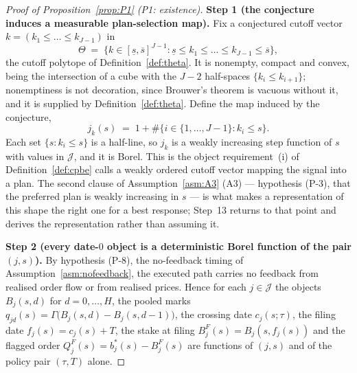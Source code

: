 \begin{proof}[Proof of Proposition~\ref{prop:P1} (P1: existence)]
\smallskip
\noindent\textbf{Step 1 (the conjecture induces a measurable plan-selection map).}
Fix a conjectured cutoff vector $k = (k_1 \le \dots \le k_{J-1})$ in
\[
\Theta \;=\; \bigl\{k \in [\underline s,\overline s]^{J-1} :
\underline s \le k_1 \le \dots \le k_{J-1} \le \overline s\bigr\},
\]
the cutoff polytope of Definition~\ref{def:theta}. It is nonempty, compact and convex, being the
intersection of a cube with the $J-2$ half-spaces $\{k_i \le k_{i+1}\}$; nonemptiness is not
decoration, since Brouwer's theorem is vacuous without it, and it is supplied by
Definition~\ref{def:theta}. Define the map induced by the conjecture,
\begin{equation}
\label{eq:P1-jk}
j_k(s) \;=\; 1 + \#\bigl\{i \in \{1,\dots,J-1\} : k_i \le s\bigr\}.
\end{equation}
Each set $\{s : k_i \le s\}$ is a half-line, so $j_k$ is a weakly increasing step function of $s$
with values in $\mathcal J$, and it is Borel. This is the object requirement~(i) of
Definition~\ref{def:cpbe} calls a weakly ordered cutoff vector mapping the signal into a plan. The
second clause of Assumption~\ref{asm:A3} (A3) --- hypothesis (P-3), that the preferred plan is weakly
increasing in $s$ --- is what makes a representation of this shape the right one for a best response;
Step~13 returns to that point and derives the representation rather than assuming it.

\smallskip
\noindent\textbf{Step 2 (every date-$0$ object is a deterministic Borel function of the pair
$(j,s)$).}
By hypothesis (P-8), the no-feedback timing of Assumption~\ref{asm:nofeedback}, the executed path
carries no feedback from realised order flow or from realised prices. Hence for each $j \in
\mathcal J$ the objects $B_j(s,d)$ for $d = 0,\dots,H$, the pooled marks $q_{jd}(s) =
\Gamma\bigl(B_j(s,d)-B_j(s,d-1)\bigr)$, the crossing date $c_j(s;\tau)$, the filing date $f_j(s) =
c_j(s)+T$, the stake at filing $B_j^F(s) = B_j(s,f_j(s))$ and the flagged order $Q_j^F(s) =
b_j^*(s)-B_j^F(s)$ are functions of $(j,s)$ and of the policy pair $(\tau,T)$ alone.


\end{proof}
